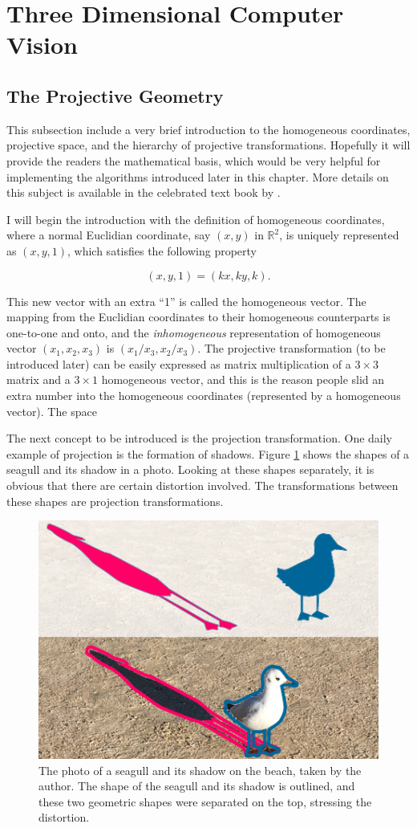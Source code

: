 \documentclass[11pt,twoside]{report}
\begin{document}
\section{Three Dimensional Computer Vision}

\subsection{The Projective Geometry}

This subsection include a very brief introduction to the homogeneous coordinates, projective space, and the hierarchy of projective transformations. Hopefully it will provide the readers the mathematical basis, which would be very helpful for implementing the algorithms introduced later in this chapter. More details on this subject is available in the celebrated text book by \citeauthor{hartley2003} \cite{hartley2003}.
 
 
I will begin the introduction with the definition of homogeneous coordinates, where a normal Euclidian coordinate, say $(x, y)$ in $\mathbb{R}^2$, is uniquely represented as $(x, y, 1)$, which satisfies the following property
 
 $$
 (x, y, 1) = (kx, ky, k).
 $$
 
 \noindent This new vector with an extra ``1'' is called the homogeneous vector. The mapping from the Euclidian coordinates to their homogeneous counterparts is one-to-one and onto, and the \emph{inhomogeneous} representation of homogeneous vector $(x_1, x_2, x_3)$ is $(x_1/x_3, x_2/x_3)$. The projective transformation (to be introduced later) can be easily expressed as matrix multiplication of a $3 \times 3$ matrix and a $3 \times 1$ homogeneous vector, and this is the reason people slid an extra number into the homogeneous coordinates (represented by a homogeneous vector). The space 
 
The next concept to be introduced is the projection transformation. One daily example of projection is the formation of shadows. Figure \ref{fig:projection-seagull} shows the shapes of a seagull and its shadow in a photo. Looking at these shapes separately, it is obvious that there are certain distortion involved. The transformations between these shapes are projection transformations.


\begin{figure}
	\includegraphics[width=0.6\linewidth,outer]{projection-seagull}
	\caption{The photo of a seagull and its shadow on the beach, taken by the author. The shape of the seagull and its shadow is outlined, and these two geometric shapes were separated on the top, stressing the distortion.}
	\label{fig:projection-seagull}
\end{figure}
\end{document}

